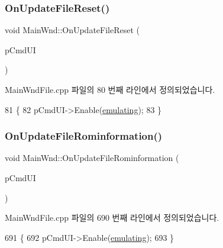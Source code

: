 \subsubsection{\texorpdfstring{On\+Update\+File\+Reset()}{OnUpdateFileReset()}}
{\footnotesize\ttfamily void Main\+Wnd\+::\+On\+Update\+File\+Reset (\begin{DoxyParamCaption}\item[{C\+Cmd\+UI $\ast$}]{p\+Cmd\+UI }\end{DoxyParamCaption})\hspace{0.3cm}{\ttfamily [protected]}}



Main\+Wnd\+File.\+cpp 파일의 80 번째 라인에서 정의되었습니다.


\begin{DoxyCode}
81 \{
82   pCmdUI->Enable(\mbox{\hyperlink{_main_wnd_file_8cpp_af9cc36078b1b311753963297ae7f2a74}{emulating}});
83 \}
\end{DoxyCode}
\mbox{\label{class_main_wnd_ad95c3d153c3dc0faac385a6b765853c8}} 
\subsubsection{\texorpdfstring{On\+Update\+File\+Rominformation()}{OnUpdateFileRominformation()}}
{\footnotesize\ttfamily void Main\+Wnd\+::\+On\+Update\+File\+Rominformation (\begin{DoxyParamCaption}\item[{C\+Cmd\+UI $\ast$}]{p\+Cmd\+UI }\end{DoxyParamCaption})\hspace{0.3cm}{\ttfamily [protected]}}



Main\+Wnd\+File.\+cpp 파일의 690 번째 라인에서 정의되었습니다.


\begin{DoxyCode}
691 \{
692   pCmdUI->Enable(\mbox{\hyperlink{_main_wnd_file_8cpp_af9cc36078b1b311753963297ae7f2a74}{emulating}});  
693 \}
\end{DoxyCode}
\mbox{\label{class_main_wnd_a751b8875a072014c27ec1eb4648e03b9}} 
